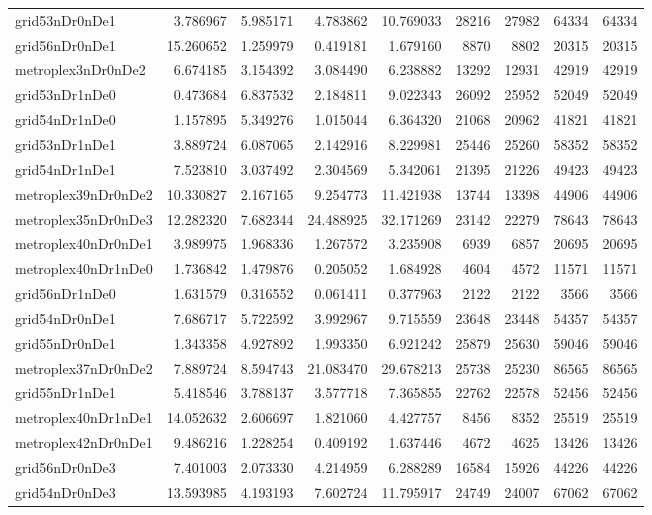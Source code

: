 \begin{longtable}{|l|r|r|r|r|r|r|r|r|}
grid53nDr0nDe1 & 3.786967 & 5.985171 & 4.783862 & 10.769033 & 28216 & 27982 & 64334 & 64334 \\
grid56nDr0nDe1 & 15.260652 & 1.259979 & 0.419181 & 1.679160 & 8870 & 8802 & 20315 & 20315 \\
metroplex3nDr0nDe2 & 6.674185 & 3.154392 & 3.084490 & 6.238882 & 13292 & 12931 & 42919 & 42919 \\
grid53nDr1nDe0 & 0.473684 & 6.837532 & 2.184811 & 9.022343 & 26092 & 25952 & 52049 & 52049 \\
grid54nDr1nDe0 & 1.157895 & 5.349276 & 1.015044 & 6.364320 & 21068 & 20962 & 41821 & 41821 \\
grid53nDr1nDe1 & 3.889724 & 6.087065 & 2.142916 & 8.229981 & 25446 & 25260 & 58352 & 58352 \\
grid54nDr1nDe1 & 7.523810 & 3.037492 & 2.304569 & 5.342061 & 21395 & 21226 & 49423 & 49423 \\
metroplex39nDr0nDe2 & 10.330827 & 2.167165 & 9.254773 & 11.421938 & 13744 & 13398 & 44906 & 44906 \\
metroplex35nDr0nDe3 & 12.282320 & 7.682344 & 24.488925 & 32.171269 & 23142 & 22279 & 78643 & 78643 \\
metroplex40nDr0nDe1 & 3.989975 & 1.968336 & 1.267572 & 3.235908 & 6939 & 6857 & 20695 & 20695 \\
metroplex40nDr1nDe0 & 1.736842 & 1.479876 & 0.205052 & 1.684928 & 4604 & 4572 & 11571 & 11571 \\
grid56nDr1nDe0 & 1.631579 & 0.316552 & 0.061411 & 0.377963 & 2122 & 2122 & 3566 & 3566 \\
grid54nDr0nDe1 & 7.686717 & 5.722592 & 3.992967 & 9.715559 & 23648 & 23448 & 54357 & 54357 \\
grid55nDr0nDe1 & 1.343358 & 4.927892 & 1.993350 & 6.921242 & 25879 & 25630 & 59046 & 59046 \\
metroplex37nDr0nDe2 & 7.889724 & 8.594743 & 21.083470 & 29.678213 & 25738 & 25230 & 86565 & 86565 \\
grid55nDr1nDe1 & 5.418546 & 3.788137 & 3.577718 & 7.365855 & 22762 & 22578 & 52456 & 52456 \\
metroplex40nDr1nDe1 & 14.052632 & 2.606697 & 1.821060 & 4.427757 & 8456 & 8352 & 25519 & 25519 \\
metroplex42nDr0nDe1 & 9.486216 & 1.228254 & 0.409192 & 1.637446 & 4672 & 4625 & 13426 & 13426 \\
grid56nDr0nDe3 & 7.401003 & 2.073330 & 4.214959 & 6.288289 & 16584 & 15926 & 44226 & 44226 \\
grid54nDr0nDe3 & 13.593985 & 4.193193 & 7.602724 & 11.795917 & 24749 & 24007 & 67062 & 67062 \\

\end{longtable}
